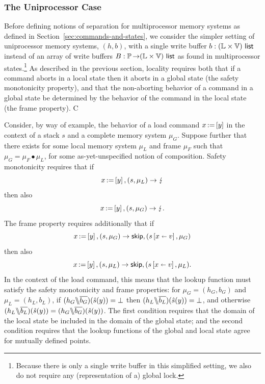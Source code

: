 \documentclass[11pt]{report}
\begin{document}
\subsubsection{The Uniprocessor Case}
\label{sec:uniprocessor-separation}

Before defining notions of separation for multiprocessor memory systems as defined in Section~\ref{sec:commands-and-states}, we consider the simpler setting of uniprocessor memory systems, $(h,b)$, with a single write buffer $b : (\mathbb{L} \times \mathbb{V})~\mathsf{list}$ instead of an array of write buffers $B : \mathbb{P} \operatorname{\rightarrow} (\mathbb{L} \times \mathbb{V})~\mathsf{list}$ as found in multiprocessor states.\footnote{Because there is only a single write buffer in this simplified setting, we also do not require any (representation of a) global lock.} As described in the previous section, locality requires both that if a command aborts in a local state then it aborts in a global state (the safety monotonicity property), and that the non-aborting behavior of a command in a global state be determined by the behavior of the command in the local state (the frame property). C

Consider, by way of example, the behavior of a load command $x \operatorname{:\!=} \left[ y \right]$ in the context of a stack $s$ and a complete memory system $\mu_G$. Suppose further that there exists for some local memory system $\mu_L$ and frame $\mu_F$ such that $\mu_G = \mu_F \bullet \mu_L$, for some as-yet-unspecified notion of composition. Safety monotonicity requires that if \[x \operatorname{:\!=} \left[ y \right],(s,\mu_L) \rightarrow \lightning\] then also \[x \operatorname{:\!=} \left[ y \right],(s,\mu_G) \rightarrow \lightning.\] The frame property requires additionally that if \[x \operatorname{:\!=} \left[ y \right],(s,\mu_G) \rightarrow \operatorname{\mathsf{skip}},(s \left[ x \shortleftarrow v \right],\mu_G)\] then also \[x \operatorname{:\!=} \left[ y \right],(s,\mu_L) \rightarrow \operatorname{\mathsf{skip}},(s \left[ x \shortleftarrow v \right],\mu_L).\] In the context of the load command, this means that the lookup function must satisfy the safety monotonicity and frame properties: for $\mu_G = (h_G,b_G)$ and $\mu_L = (h_L,b_L)$, if $(h_G \backslash\!\!\backslash \overline{b_G})(\hat{s}(y)) = \bot$ then $(h_L \backslash\!\!\backslash \overline{b_L})(\hat{s}(y)) = \bot$, and otherwise $(h_L \backslash\!\!\backslash \overline{b_L})(\hat{s}(y)) = (h_G \backslash\!\!\backslash \overline{b_G})(\hat{s}(y))$. The first condition requires that the domain of the local state be included in the domain of the global state; and the second condition requires that the lookup functions of the global and local state agree for mutually defined points.  
\end{document}
